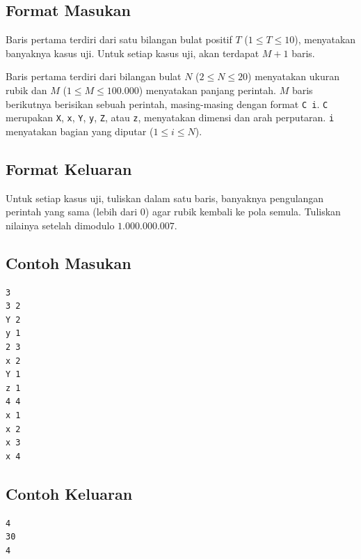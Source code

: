 \documentclass{article}
\begin{document}
\subsection*{Format Masukan}

Baris pertama terdiri dari satu bilangan bulat positif $T$ ($1 \leq T \leq 10$), menyatakan banyaknya kasus uji.
Untuk setiap kasus uji, akan terdapat $M + 1$ baris.

Baris pertama terdiri dari bilangan bulat $N$ ($2 \leq N \leq 20$) menyatakan ukuran rubik dan $M$ ($1 \leq M \leq 100.000$) menyatakan panjang perintah.
$M$ baris berikutnya berisikan sebuah perintah, masing-masing dengan format \lstinline{C i}.
\lstinline{C} merupakan \lstinline{X}, \lstinline{x}, \lstinline{Y}, \lstinline{y}, \lstinline{Z}, atau \lstinline{z}, menyatakan dimensi dan arah perputaran.
\lstinline{i} menyatakan bagian yang diputar ($1 \leq i \leq N$).

\subsection*{Format Keluaran}

Untuk setiap kasus uji, tuliskan dalam satu baris, banyaknya pengulangan perintah yang sama (lebih dari 0) agar rubik kembali ke pola semula. Tuliskan nilainya setelah dimodulo $1.000.000.007$.

\pagebreak

\begin{multicols}{2}
\subsection*{Contoh Masukan}
\begin{lstlisting}
3
3 2
Y 2
y 1
2 3
x 2
Y 1
z 1
4 4
x 1
x 2
x 3
x 4
\end{lstlisting}
\columnbreak
\subsection*{Contoh Keluaran}
\begin{lstlisting}
4
30
4
\end{lstlisting}
\vfill
\null
\end{multicols}
\end{document}
